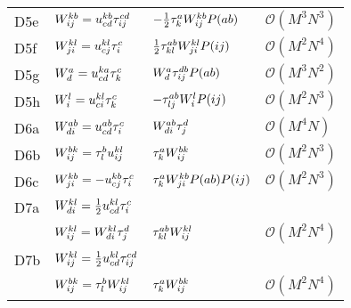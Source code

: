 \begin{center}
\begin{longtable}{@{}llll@{}}
                D5e
                & $W^{kb}_{ij} = u^{kb}_{cd} \tau^{cd}_{ij}$
                & $-\frac{1}{2} \tau^{a}_{k} W^{kb}_{ij} P(ab)$
                & $\mathcal{O}(M^3 N^3)$ \\

                D5f
                & $W^{kl}_{ji} = u^{kl}_{cj} \tau^{c}_{i}$
                & $\frac{1}{2} \tau^{ab}_{kl} W^{kl}_{ji} P(ij)$
                & $\mathcal{O}(M^2 N^4)$ \\

                D5g
                & $W^{a}_{d} = u^{ka}_{cd} \tau^{c}_{k}$
                & $W^{a}_{d} \tau^{db}_{ij} P(ab)$
                & $\mathcal{O}(M^3 N^2)$ \\

                D5h
                & $W^{l}_{i} = u^{kl}_{ci} \tau^{c}_{k}$
                & $-\tau^{ab}_{lj} W^{l}_{i} P(ij)$
                & $\mathcal{O}(M^2 N^3)$ \\

                D6a
                & $W^{ab}_{di} = u^{ab}_{cd} \tau^{c}_{i}$
                & $W^{ab}_{di} \tau^{d}_{j}$
                & $\mathcal{O}(M^4 N)$ \\

                D6b
                & $W^{bk}_{ij} = \tau^{b}_{l} u^{kl}_{ij}$
                & $\tau^{a}_{k} W^{bk}_{ij}$
                & $\mathcal{O}(M^2 N^3)$ \\

                D6c
                & $W^{kb}_{ji} = -u^{kb}_{cj} \tau^{c}_{i}$
                & $\tau^{a}_{k} W^{kb}_{ji} P(ab) P(ij)$
                & $\mathcal{O}(M^2 N^3)$ \\

                D7a
                & $W^{kl}_{di} = \frac{1}{2} u^{kl}_{cd} \tau^{c}_{i}$
                \\
                & $W^{kl}_{ij} = W^{kl}_{di} \tau^{d}_{j}$
                & $\tau^{ab}_{kl} W^{kl}_{ij}$
                & $\mathcal{O}(M^2 N^4)$ \\

                D7b
                & $W^{kl}_{ij} = \frac{1}{2} u^{kl}_{cd} \tau^{cd}_{ij}$ \\
                & $W^{bk}_{ij} = \tau^{b}_{l} W^{kl}_{ij}$
                & $\tau^{a}_{k} W^{bk}_{ij}$
                & $\mathcal{O}(M^2 N^4)$ \\


\end{longtable}
\end{center}
